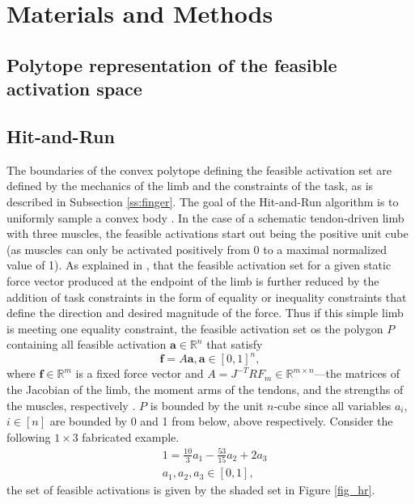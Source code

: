 \section{Materials and Methods}

\subsection{Polytope representation of the feasible activation space}



\subsection{Hit-and-Run}
The boundaries of the convex polytope defining the feasible activation set are defined by the mechanics of the limb and the constraints of the task, as is described in Subsection \ref{ss:finger}. The goal of the Hit-and-Run algorithm is to uniformly sample  a convex body \cite{smith1984efficient}. 
In the case of a schematic tendon-driven limb with three muscles, the feasible activations start out being the positive unit cube (as muscles can only be activated positively from 0 to a maximal normalized value of 1). As explained in \cite{Valero-Cuevas2009mathematical}, that the feasible activation set for a given static force vector produced at the endpoint of the limb is further reduced by the addition of task constraints  in the form of equality or inequality constraints that define the direction and desired magnitude of the force. Thus if this simple limb is meeting one equality constraint, the feasible activation set os the polygon $P$ containing all feasible activation  $\textbf{a} \in \mathbb{R}^n$ that satisfy
\[\textbf{f} = A\textbf{a}, \textbf{a} \in [0,1]^n,\]
where $\textbf{f} \in \mathbb{R}^m$ is a fixed force vector and $A = J^{-T}RF_m \in \mathbb{R}^{m \times n}$---the matrices of the Jacobian of the limb, the moment arms of the tendons, and the strengths of the muscles, respectively \cite{Valero-Cuevas1998Large,Valero-Cuevas2009mathematical}. $P$ is bounded by the unit $n$-cube since all variables $a_i$, $i \in [n]$ are bounded by 0 and 1 from below, above respectively.
Consider the following $1 \times 3$ fabricated example.
\begin{align*}
&1 = \frac{10}{3}a_1 - \frac{53}{15}a_2 + 2a_3 \\
&a_1, a_2, a_3 \in [0,1],
\end{align*}
the set of feasible activations is given by the shaded set in Figure \ref{fig_hr}.

